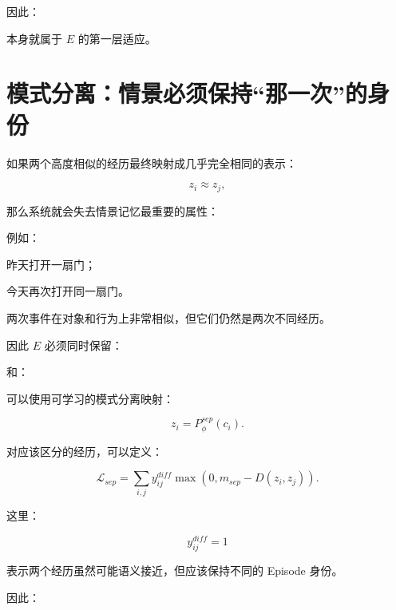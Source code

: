 因此：

\begin{statementbox}
\centering
{}
\end{statementbox}

本身就属于 \(E\) 的第一层适应。


\section{模式分离：情景必须保持“那一次”的身份}

如果两个高度相似的经历最终映射成几乎完全相同的表示：

\[
z_i\approx z_j,
\]

那么系统就会失去情景记忆最重要的属性：

\begin{statementbox}
\centering
{}
\end{statementbox}

例如：

昨天打开一扇门；

今天再次打开同一扇门。

两次事件在对象和行为上非常相似，但它们仍然是两次不同经历。

因此 \(E\) 必须同时保留：

\begin{statementbox}
\centering
{}
\end{statementbox}

和：

\begin{statementbox}
\centering
{}
\end{statementbox}

可以使用可学习的模式分离映射：

\[
z_i
=
P_{\phi}^{sep}(c_i).
\]

对应该区分的经历，可以定义：

\[
\mathcal L_{sep}
=
\sum_{i,j}
y_{ij}^{diff}
\max
\left(
0,
m_{sep}-D(z_i,z_j)
\right).
\]

这里：

\[
y_{ij}^{diff}=1
\]

表示两个经历虽然可能语义接近，但应该保持不同的 Episode 身份。

因此：

\begin{statementbox}
\centering
{}
\end{statementbox}

